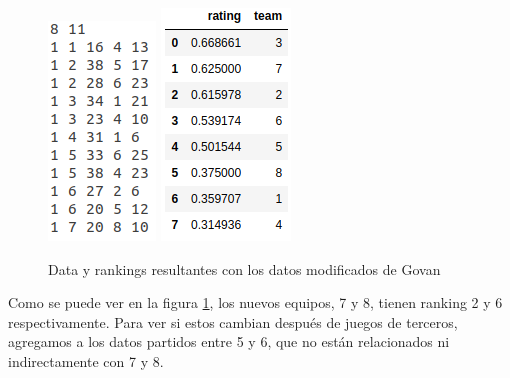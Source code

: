\documentclass[a4paper]{article}
\begin{document}
\begin{figure}[H]
    \begin{center}
        \includegraphics[scale=0.75]{img/justo/govan-changed.png}
        \includegraphics[scale=0.75]{img/justo/govan-rating-changed.png}
        \caption{Data y rankings resultantes con los datos modificados de Govan}
        \label{govan-changed}
    \end{center}
\end{figure}

Como se puede ver en la figura \ref{govan-changed}, los nuevos equipos, 7 y 8, tienen ranking 2 y 6 respectivamente. Para ver si estos cambian después de juegos de terceros, agregamos a los datos partidos entre 5 y 6, que no están relacionados ni indirectamente con 7 y 8.
\end{document}
